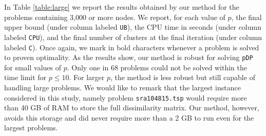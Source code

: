\documentclass[a4paper,10pt]{article}
\newcommand{\pDP}{\texttt{pDP}}
\begin{document}
In Table \ref{table:large} we report the results obtained by our method for the problems containing 3,000 or more nodes. We report, for each value of $p$, the final upper bound (under column labeled \texttt{UB}), the CPU time in seconds (under column labeled \texttt{CPU}), and the final number of clusters at the final iteration (under column labeled \texttt{C}). Once again, we mark in bold characters whenever a problem is solved to proven optimality. As the results show, our method is robust for solving \pDP{} for small values of $p$. Only one in 68 problems could not be solved within the time limit for $p\leq 10$. For larger $p$, the method is less robust but still capable of handling large problems. We would like to remark that the largest instance considered in this study, namely problem \texttt{sra104815.tsp} would require more than 40 GB of RAM to store the full dissimilarity matrix. Our method, however, avoids this storage and did never require more than a 2 GB to run even for the largest problems.
\end{document}
